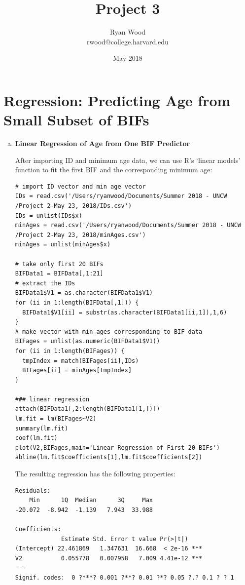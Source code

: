 \documentclass{article}
\title{Project 3}
\author{Ryan Wood\\
rwood@college.harvard.edu}
\date{May 2018}
\begin{document}
\maketitle

\section{Regression: Predicting Age from Small Subset of BIFs}
\begin{enumerate}[a)]
\item \textbf{Linear Regression of Age from One BIF Predictor}

After importing ID and minimum age data, we can use R's `linear models' function to fit the first BIF and the corresponding minimum age:\\
\begin{verbatim}
# import ID vector and min age vector
IDs = read.csv('/Users/ryanwood/Documents/Summer 2018 - UNCW /Project 2-May 23, 2018/IDs.csv')
IDs = unlist(IDs$x)
minAges = read.csv('/Users/ryanwood/Documents/Summer 2018 - UNCW /Project 2-May 23, 2018/minAges.csv')
minAges = unlist(minAges$x)

# take only first 20 BIFs
BIFData1 = BIFData[,1:21]
# extract the IDs
BIFData1$V1 = as.character(BIFData1$V1)
for (ii in 1:length(BIFData[,1])) {
  BIFData1$V1[ii] = substr(as.character(BIFData1[ii,1]),1,6)
}
# make vector with min ages corresponding to BIF data
BIFages = unlist(as.numeric(BIFData1$V1))
for (ii in 1:length(BIFages)) {
  tmpIndex = match(BIFages[ii],IDs)
  BIFages[ii] = minAges[tmpIndex]
}

### linear regression
attach(BIFData1[,2:length(BIFData1[1,])])
lm.fit = lm(BIFages~V2)
summary(lm.fit)
coef(lm.fit)
plot(V2,BIFages,main='Linear Regression of First 20 BIFs')
abline(lm.fit$coefficients[1],lm.fit$coefficients[2])
\end{verbatim}

The resulting regression has the following properties:\\
\begin{verbatim}
Residuals:
    Min      1Q  Median      3Q     Max 
-20.072  -8.942  -1.139   7.943  33.988 

Coefficients:
             Estimate Std. Error t value Pr(>|t|)    
(Intercept) 22.461869   1.347631  16.668  < 2e-16 ***
V2           0.055778   0.007958   7.009 4.41e-12 ***
---
Signif. codes:  0 ?***? 0.001 ?**? 0.01 ?*? 0.05 ?.? 0.1 ? ? 1


\end{verbatim}
\end{enumerate}
\end{document}
